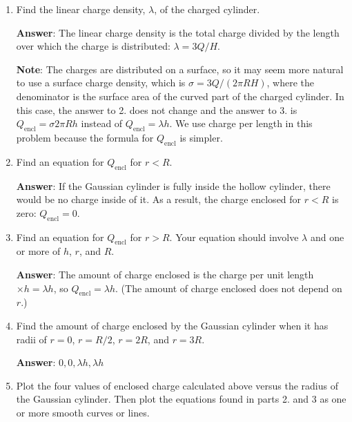 \documentclass{article}
\begin{document}
\begin{enumerate}

  \item Find the linear charge density, $\lambda$, of the charged cylinder.

        \ifsolutions
        {\bf Answer}: The linear charge density is the total charge divided by the length over which the charge is distributed: $\lambda={3Q}/{H}$.

        {\bf Note}: The charges are distributed on a surface, so it may seem more natural to use a surface charge density, which is $\sigma = 3Q/(2\pi R H)$, where the denominator is the surface area of the curved part of the charged cylinder. In this case, the answer to 2. does not change and the answer to 3. is $Q_{\text{encl}} = \sigma 2\pi R h$ instead of $Q_{\text{encl}}=\lambda h$. We use charge per length in this problem because the formula for $Q_{\text{encl}}$ is simpler.
        \fi

        \ifsolutions\else
        \vskip 36pt
        \fi

  \item Find an equation for $Q_{\text{encl}}$ for $r<R$.

        \ifsolutions
        {\bf Answer}: If the Gaussian cylinder is fully inside the hollow cylinder, there would be no charge inside of it. As a result, the charge enclosed for $r< R$ is zero: $Q_{\text{encl}}=0$.
        \fi

        \ifsolutions\else
        \vskip 36pt
        \fi

  \item Find an equation for $Q_{\text{encl}}$ for $r>R$. Your equation should involve $\lambda$ and one or more of $h$, $r$, and $R$.

        \ifsolutions
        {\bf Answer}: The amount of charge enclosed is the charge per unit length $\times h = \lambda h$, so  $Q_{\text{encl}}=\lambda h$. (The amount of charge enclosed does not depend on $r$.)
        \fi

        \ifsolutions\else
        \vskip 36pt
        \fi

  \item Find the amount of charge enclosed by the Gaussian cylinder when it has radii of $r=0$, $r=R/2$, $r=2R$, and $r=3R$.

        \ifsolutions
        {\bf Answer}: $0, 0, \lambda h, \lambda h$
        \fi

        \ifsolutions\else
        \vskip 36pt
        \fi

  \item Plot the four values of enclosed charge calculated above versus the radius of the Gaussian cylinder. Then plot the equations found in parts 2. and 3 as one or more smooth curves or lines.

        \ifsolutions
        
        \fi

\end{enumerate}
\end{document}
